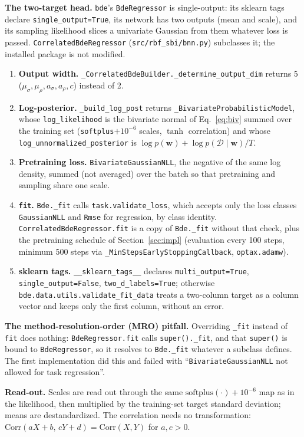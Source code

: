 \documentclass[11pt]{article}
\newcommand{\code}[1]{\texttt{#1}}
\begin{document}
\textbf{The two-target head.} \code{bde}'s \code{BdeRegressor} is single-output: its sklearn tags declare \code{single\_output=True}, its
network has two outputs (mean and scale), and its sampling likelihood slices a univariate Gaussian from them
whatever loss is passed. \code{CorrelatedBdeRegressor} (\code{src/rbf\_sbi/bnn.py}) subclasses it; the installed package is
not modified.
\begin{enumerate}
\item \textbf{Output width.} \code{\_CorrelatedBdeBuilder.\_determine\_output\_dim} returns 5
  ($\mu_\sigma,\mu_\rho,a_\sigma,a_\rho,c$) instead of 2.
\item \textbf{Log-posterior.} \code{\_build\_log\_post} returns \code{\_BivariateProbabilisticModel}, whose
  \code{log\_likelihood} is the bivariate normal of Eq.~\eqref{eq:biv} summed over the training set
  (\code{softplus}$+10^{-6}$ scales, $\tanh$ correlation) and whose \code{log\_unnormalized\_posterior} is
  $\log p(\mathbf w)+\log p(\mathcal D\mid\mathbf w)/T$.
\item \textbf{Pretraining loss.} \code{BivariateGaussianNLL}, the negative of the same log density, summed (not
  averaged) over the batch so that pretraining and sampling share one scale.
\item \textbf{\code{fit}.} \code{Bde.\_fit} calls \code{task.validate\_loss}, which accepts only the loss classes
  \code{GaussianNLL} and \code{Rmse} for regression, by class identity. \code{CorrelatedBdeRegressor.fit} is a copy of
  \code{Bde.\_fit} without that check, plus the pretraining schedule of Section~\ref{sec:impl} (evaluation every 100
  steps, minimum 500 steps via \code{\_MinStepsEarlyStoppingCallback}, \code{optax.adamw}).
\item \textbf{sklearn tags.} \code{\_\_sklearn\_tags\_\_} declares \code{multi\_output=True}, \code{single\_output=False},
  \code{two\_d\_labels=True}; otherwise \code{bde.data.utils.validate\_fit\_data} treats a two-column target as a
  column vector and keeps only the first column, without an error.
\end{enumerate}
\textbf{The method-resolution-order (MRO) pitfall.} Overriding \code{\_fit} instead of \code{fit} does nothing: \code{BdeRegressor.fit} calls
\code{super().\_fit}, and that \code{super()} is bound to \code{BdeRegressor}, so it resolves to \code{Bde.\_fit}
whatever a subclass defines. The first implementation did this and failed with ``\code{BivariateGaussianNLL} not
allowed for task regression''.

\textbf{Read-out.} Scales are read out through the same $\mathrm{softplus}(\cdot)+10^{-6}$ map as in the likelihood,
then multiplied by the training-set target standard deviation; means are destandardized. The correlation needs no
transformation: $\mathrm{Corr}(aX+b,\,cY+d)=\mathrm{Corr}(X,Y)$ for $a,c>0$.
\end{document}

